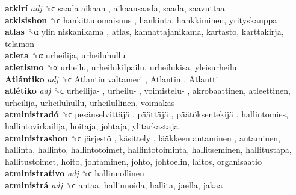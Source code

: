 \textbf{atkirí} \emph{adj}  ␝ϲ   saada aikaan , aikaansaada, saada, saavuttaa  \\
\textbf{atkisishon} ␝ϲ   hankittu omaisuus , hankinta, hankkiminen, yrityskauppa  \\
\textbf{atlas} ␝α   ylin niskanikama , atlas, kannattajanikama, kartasto, karttakirja, telamon  \\
\textbf{atleta} ␝α  urheilija, urheiluhullu  \\
\textbf{atletismo} ␝α  urheilu, urheilukilpailu, urheilukisa, yleisurheilu  \\
\textbf{Atlántiko} \emph{adj}  ␝ϲ   Atlantin valtameri ,  Atlantin ,  Atlantti   \\
\textbf{atlétiko} \emph{adj}  ␝ϲ   urheilija- ,  urheilu- ,  voimistelu- , akrobaattinen, atleettinen, urheilija, urheiluhullu, urheilullinen, voimakas  \\
\textbf{atministradó} ␝ϲ   pesänselvittäjä ,  päättäjä ,  päätöksentekijä , hallintomies, hallintovirkailija, hoitaja, johtaja, ylitarkastaja  \\
\textbf{atministrashon} ␝ϲ   järjestö ,  käsittely ,  lääkkeen antaminen , antaminen, hallinta, hallinto, hallintotoimet, hallintotoiminta, hallitseminen, hallitustapa, hallitustoimet, hoito, johtaminen, johto, johtoelin, laitos, organisaatio  \\
\textbf{atministrativo} \emph{adj}  ␝ϲ  hallinnollinen  \\
\textbf{atministrá} \emph{adj}  ␝ϲ  antaa, hallinnoida, hallita, jaella, jakaa  \\
